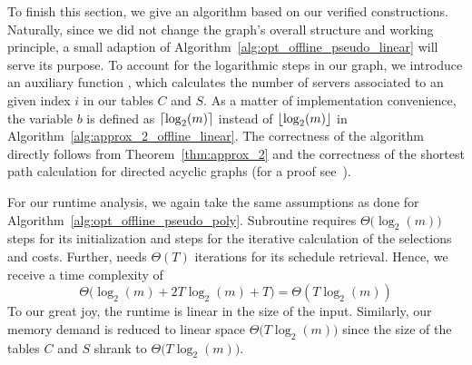 To finish this section, we give an algorithm based on our verified constructions. Naturally, since we did not change the graph's overall structure and working principle, a small adaption of Algorithm~\ref{alg:opt_offline_pseudo_linear} will serve its purpose. To account for the logarithmic steps in our graph, we introduce an auxiliary function , which calculates the number of servers associated to an given index $i$ in our tables $C$ and $S$. As a matter of implementation convenience, the variable $b$ is defined as $\lceil\log_2(m)\rceil$ instead of $\lfloor\log_2(m)\rfloor$ in Algorithm~\ref{alg:approx_2_offline_linear}.
The correctness of the algorithm directly follows from Theorem~\ref{thm:approx_2} and the correctness of the shortest path calculation for directed acyclic graphs (for a proof see~\parencite[Section~24.2]{intro-algo}).

For our runtime analysis, we again take the same assumptions as done for Algorithm~\ref{alg:opt_offline_pseudo_poly}. Subroutine  requires $\Theta\bigl(\log_2(m)\bigr)$ steps for its initialization and  steps for the iterative calculation of the selections and costs. Further,  needs $\Theta(T)$ iterations for its schedule retrieval. Hence, we receive a time complexity of
\begin{equation*}
	\Theta\bigl(\log_2(m)+2T\log_2(m)+T\bigr)=\Theta(T\log_2(m))
\end{equation*}
To our great joy, the runtime is linear in the size of the input. Similarly, our memory demand is reduced to linear space $\Theta\bigl(T\log_2(m)\bigr)$ since the size of the tables $C$ and $S$ shrank to $\Theta\bigl(T\log_2(m)\bigr)$.

